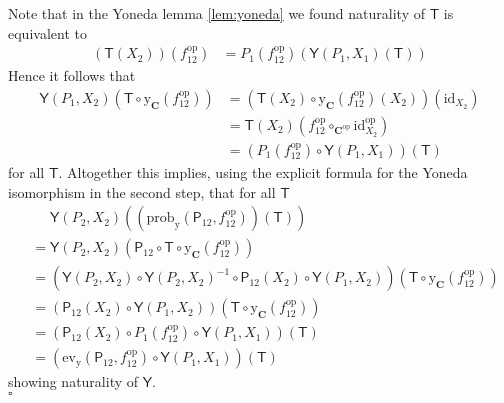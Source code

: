 \begin{prf}
Note that in the Yoneda lemma \ref{lem:yoneda} we found naturality of $\mathsf{T}$ is equivalent to
\begin{align*}
  (\mathsf{T}(X_{2}))(f_{12}^{\mathrm{op}})
  &=
  P_{1}(f_{12}^{\mathrm{op}})
  \left(
    \mathsf{Y}(P_{1},X_{1})
    (\mathsf{T})
  \right)
\end{align*}
Hence it follows that
\begin{align*}
  \mathsf{Y}(P_{1},X_{2})
  \left(
    \mathsf{T}
    \circ
    \mathrm{y}_{\mathbf{C}}(f_{12}^{\mathrm{op}})
  \right)
  &=
  \left(
    \mathsf{T}(X_{2})
    \circ
    \mathrm{y}_{\mathbf{C}}(f_{12}^{\mathrm{op}})(X_{2})
  \right)
  (\mathrm{id}_{X_{2}})
  \\
  &=
  \mathsf{T}(X_{2})
  \left(
    f_{12}^{\mathrm{op}}
    \circ_{\mathbf{C}^{\mathrm{op}}}
    \mathrm{id}_{X_{2}}^{\mathrm{op}}
  \right)
  \\
  &{=}
  \left(
    P_{1}(f_{12}^{\mathrm{op}})
    \circ
    \mathsf{Y}(P_{1},X_{1})
  \right)
  (\mathsf{T})
  \tag{NT}
\end{align*}
for all $\mathsf{T}$. Altogether this implies, using the explicit formula for the Yoneda isomorphism in the second step, that for all $\mathsf{T}$
\begin{align*}
  &\phantom{=}
  \mathsf{Y}(P_{2},X_{2})
  \left(
    \left(
      \mathrm{prob}_{\mathrm{y}}
      (\mathsf{P}_{12},f_{12}^{\mathrm{op}})
    \right)
    (\mathsf{T})
  \right)
  \\
  &=
  \mathsf{Y}(P_{2},X_{2})
  \left(
    \mathsf{P}_{12}
    \circ
    \mathsf{T}
    \circ
    \mathrm{y}_{\mathbf{C}}(f_{12}^{\mathrm{op}})
  \right)
  \\
  &=
  \left(
    \mathsf{Y}(P_{2},X_{2})
    \circ
    \mathsf{Y}(P_{2},X_{2})^{-1}
    \circ
    \mathsf{P}_{12}(X_{2})
    \circ
    \mathsf{Y}(P_{1},X_{2})
  \right)
  \left(
    \mathsf{T}
    \circ
    \mathrm{y}_{\mathbf{C}}(f_{12}^{\mathrm{op}})
  \right)
  \\
  &=
  \left(
    \mathsf{P}_{12}(X_{2})
    \circ
    \mathsf{Y}(P_{1},X_{2})
  \right)
  \left(
    \mathsf{T}
    \circ
    \mathrm{y}_{\mathbf{C}}(f_{12}^{\mathrm{op}})
  \right)
  \\
  &=
  \left(
    \mathsf{P}_{12}(X_{2})
    \circ
    P_{1}(f_{12}^{\mathrm{op}})
    \circ
    \mathsf{Y}(P_{1},X_{1})
  \right)
  (\mathsf{T})
  \\
  &=
  \left(
    \mathrm{ev}_{\mathrm{y}}
    (\mathsf{P}_{12},f_{12}^{\mathrm{op}})
    \circ
    \mathsf{Y}(P_{1},X_{1})
  \right)
  (\mathsf{T})
\end{align*}
showing naturality of $\mathsf{Y}$.
\\
\phantom{proven}
\hfill
$\square$
\end{prf}
